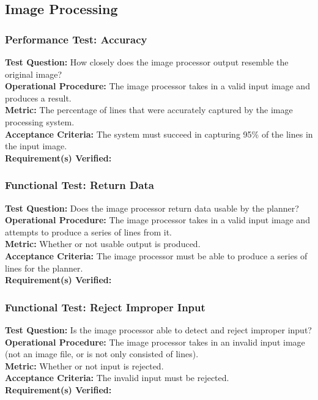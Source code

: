 
\subsection{Image Processing}
\label{sec:verification_image}

\subsubsection{Performance Test: Accuracy}
\label{test:image_pt_accuracy}
\textbf{Test Question:} How closely does the image processor output resemble the original image?\\
\textbf{Operational Procedure:} The image processor takes in a valid input image and produces a result.\\
\textbf{Metric:} The percentage of lines that were accurately captured by the image processing system.\\
\textbf{Acceptance Criteria:} The system must succeed in capturing 95\% of the lines in the input image.\\
\textbf{Requirement(s) Verified:} 

\subsubsection{Functional Test: Return Data}
\label{test:image_ft_data}
\textbf{Test Question:} Does the image processor return data usable by the planner?\\
\textbf{Operational Procedure:} The image processor takes in a valid input image and attempts to produce a series of lines from it.\\
\textbf{Metric:} Whether or not usable output is produced.\\
\textbf{Acceptance Criteria:} The image processor must be able to produce a series of lines for the planner.\\
\textbf{Requirement(s) Verified:} 

\subsubsection{Functional Test: Reject Improper Input}
\label{test:image_ft_reject}
\textbf{Test Question:} Is the image processor able to detect and reject improper input?\\
\textbf{Operational Procedure:} The image processor takes in an invalid input image (not an image file, or is not only consisted of lines). \\
\textbf{Metric:} Whether or not input is rejected.\\
\textbf{Acceptance Criteria:} The invalid input must be rejected.\\
\textbf{Requirement(s) Verified:} 


